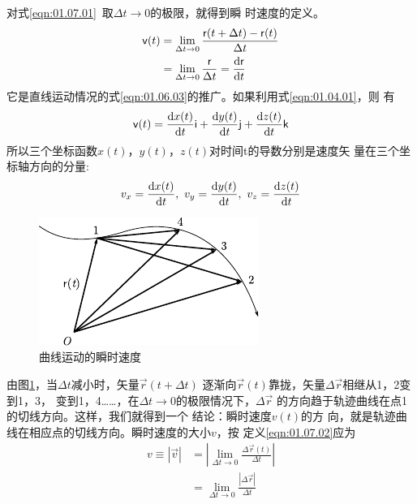 对式\eqref{eqn:01.07.01}~取$\Delta t \rightarrow 0$的极限，就得到瞬
时速度的定义。
\begin{equation}\label{eqn:01.07.02}
    \begin{aligned}
        {\mathsf{v}}(t) & =\lim _{\Delta t \rightarrow 0} \frac{{\mathsf{r}}(t+\Delta t)-{\mathsf{r}}(t)}{\Delta t} \\
                  & =\lim _{\Delta t \rightarrow 0} \frac{{\mathsf{r}}}{\Delta t} =\frac{{\rm d}{\mathsf{r}}}{{\rm d} t}
    \end{aligned}
\end{equation}
它是直线运动情况的式\eqref{eqn:01.06.03}的推广。如果利用式\eqref{eqn:01.04.01}，则
有
\begin{equation}\label{eqn:01.07.03}
    {\mathsf{v}}(t)=\frac{{\rm d} x(t)}{{\rm d} t} {\mathsf{i}}+\frac{{\rm d} y(t)}{{\rm d} t} {\mathsf{j}}+\frac{{\rm d} z(t)}{{\rm d} t} {\mathsf{k}}
\end{equation}
所以三个坐标函数$x(t)$，$y(t)$，$z(t)$对时间t的导数分别是速度矢
量在三个坐标轴方向的分量:
\begin{equation}\label{eqn:01.07.04}
    v_{x}=\frac{{\rm d} x(t)}{{\rm d} t}, ~ v_{y}=\frac{{\rm d} y(t)}{{\rm d} t}, ~ v_{z}=\frac{{\rm d} z(t)}{{\rm d} t}
\end{equation}
\clearpage
\begin{figure}
    \centering
    \small
    \includegraphics{figure/fig01.12}
    \caption{曲线运动的瞬时速度}
    \label{fig:01.12}
\end{figure}
由图\ref{fig:01.12}，当$\Delta t$减小时，矢量$\vec{r}(t+\Delta t)$
逐渐向$\vec{r}(t)$靠拢，矢量$\Delta \vec{r}$相继从1，2变到1，3，
变到1，4……，在$\Delta t \rightarrow 0$的极限情况下，$\Delta \vec{r}$
的方向趋于轨迹曲线在点1的切线方向。这样，我们就得到一个
结论：瞬时速度$v(t)$的方
向，就是轨迹曲线在相应点的切线方向。瞬时速度的大小$v$，按
定义\eqref{eqn:01.07.02}应为
\setlength{\mathindent}{15em}
\begin{equation*}
    \begin{aligned}
        v\equiv |\vec{v}| & =\left|\lim _{\Delta t \rightarrow 0} \frac{\Delta \vec{r}(t)}{\Delta t}\right| \\
                         & =\lim _{\Delta t \rightarrow 0} \frac{|\Delta \vec{r}|}{\Delta t}
    \end{aligned}
\end{equation*}

